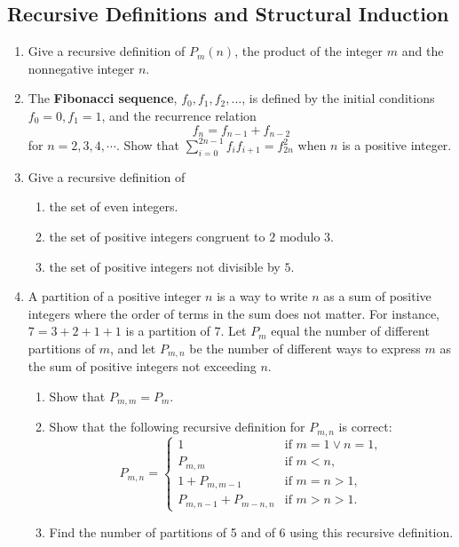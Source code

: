 \documentclass{../../cls/sig-alternate-05-2015}
\begin{document}
\subsection{Recursive Definitions and Structural Induction}
\begin{enumerate}
\item Give a recursive definition of $P_m(n)$, the product of the
integer $m$ and the nonnegative integer $n$.
	
\item The \textbf{Fibonacci sequence},
$f_0, f_1, f_2, \ldots$,
is defined by the initial conditions $f_0 = 0, f_1 = 1$,
and the recurrence relation \begin{equation}
    f_n = f_{n - 1} + f_{n - 2}
\end{equation} for $n = 2, 3, 4, \cdots$.
Show that $\sum_{i = 0}^{2n - 1} f_i f_{i + 1} = f_{2n}^2$ when $n$ is a positive integer.

\item Give a recursive definition of
\begin{enumerate}
	\item the set of even integers.
	\item the set of positive integers congruent to $2$ modulo $3$.
	\item the set of positive integers not divisible by $5$.
\end{enumerate}


\item A partition of a positive integer $n$ is a way to write $n$ as a sum of positive integers where the order of terms in
the sum does not matter.
For instance, $7 = 3 + 2 + 1 + 1$ is a partition of $7$.
Let $P_m$ equal the number of different partitions of $m$,
and let $P_{m, n}$ be the number of different ways to express $m$ as the sum of positive integers not exceeding $n$. \begin{enumerate}
    \item Show that $P_{m, m} = P_m$.
    \item Show that the following recursive definition for $P_{m, n}$ is correct: \begin{equation}
        P_{m, n} = \begin{cases}
        1 & \text{if } m = 1 \lor n = 1,\\
        P_{m, m} & \text{if } m < n,\\
        1 + P_{m, m - 1} & \text{if } m = n > 1,\\
        P_{m, n - 1} + P_{m - n, n} & \text{if } m > n > 1.
        \end{cases}
    \end{equation}
    \item Find the number of partitions of 5 and of 6 using this recursive definition.
\end{enumerate}


\end{enumerate}
\end{document}
